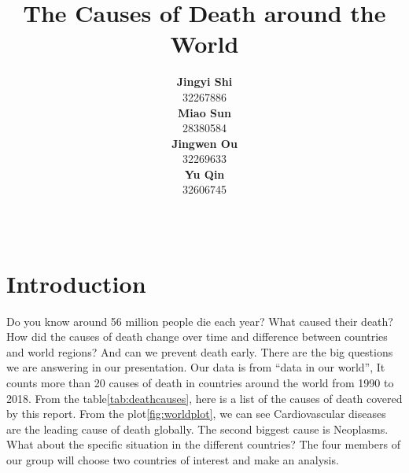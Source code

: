 \documentclass[11pt,a4paper,]{article}
\title{The Causes of Death around the World}
\author{\sf\Large\textbf{ Jingyi Shi}\\ {\sf\large 32267886\\[0.5cm]} \sf\Large\textbf{ Miao Sun}\\ {\sf\large 28380584\\[0.5cm]} \sf\Large\textbf{ Jingwen Ou}\\ {\sf\large 32269633\\[0.5cm]} \sf\Large\textbf{ Yu Qin}\\ {\sf\large 32606745\\[0.5cm]}}
\date{\sf\Date~\Month~\Year}
\makeatletter
\def\titlepage{\front{\expandafter{\@title}}{\@author}{\@organization}}
\makeatother
\begin{document}
\titlepage

\clearpage

\hypertarget{introduction}{%
\section{Introduction}\label{introduction}}

Do you know around 56 million people die each year? What caused their death? How did the causes of death change over time and difference between countries and world regions? And can we prevent death early. There are the big questions we are answering in our presentation. Our data is from ``data in our world'', It counts more than 20 causes of death in countries around the world from 1990 to 2018. From the table\ref{tab:deathcauses}, here is a list of the causes of death covered by this report. From the plot\ref{fig:worldplot}, we can see Cardiovascular diseases are the leading cause of death globally. The second biggest cause is Neoplasms. What about the specific situation in the different countries? The four members of our group will choose two countries of interest and make an analysis.
\end{document}
